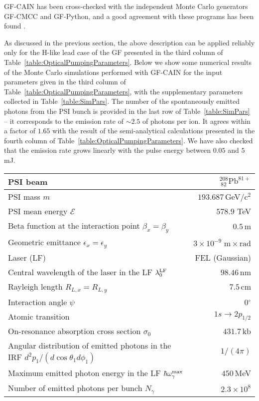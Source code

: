 {\sf GF-CAIN} has been cross-checked with the independent Monte Carlo generators {\sf GF-CMCC} and {\sf GF-Python}, and a good agreement with these programs has been found \cite{Curatolo:2018pza,GF-PoP-LoI:2019}. 

As discussed in the previous section, the above description can be applied reliably only for the H-like lead case of the GF presented in the third column of Table~\ref{table:OpticalPumpingParameters}.  Below we show some numerical results of the Monte Carlo simulations performed with {\sf GF-CAIN} for the input parameters given in the third column of Table~\ref{table:OpticalPumpingParameters}, with the supplementary parameters collected in Table~\ref{table:SimPars}.  The number of the spontaneously emitted photons from the PSI bunch is provided in the last row of Table~\ref{table:SimPars} -- it corresponds to the emission rate of $\sim 2.5$ of photons per ion.  It agrees within a factor of $1.65$ with the result of the semi-analytical calculations presented in the fourth column of Table~\ref{table:OpticalPumpingParameters}.  We have also checked that the emission rate grows linearly with the pulse energy between $0.05$ and $5\,$mJ.  
\begin{table*}[!htbp]
    \centering
    \caption{Some parameters for the {\sf GF-CAIN} simulations and the number of spontaneously emitted photons.}
	\begin{tabular}{lr}\hline\hline
		PSI beam  & ${}^{208}_{~82}\mathrm{Pb}^{81+}$\\
		\hline
		PSI mass $m$ & $193.687\,$GeV/c$^2$ \\
		PSI mean energy $\mathcal{E}$ & $578.9$ TeV \\
        Beta function at the interaction point $\beta_x=\beta_y$ & $0.5\,\mathrm{m}$\\
        Geometric emittance $\epsilon_x=\epsilon_y$ & $3\times 10^{-9}\;\mathrm{m\times rad}$\\
		\hline
		Laser (LF) & FEL (Gaussian)\\
		\hline
		Central wavelength of the laser in the LF $\lambda_0^{\rm LF}$ & $98.46\,$nm  \\
	    Rayleigh length $R_{L,x} = R_{L,y}$ & $7.5\,\mathrm{cm}$\\
		Interaction angle $\psi$ & 0$^\circ$\\
		\hline
 		 Atomic transition  & $1s \rightarrow 2p_{1/2}$\\
		\hline
		On-resonance absorption cross section $\sigma_0$ & $431.7\,$kb\\
		Angular distribution of emitted photons in the IRF $d^2p_1/(d\cos\theta_1 d\phi_1)$ & $1/(4\pi)$\\
		Maximum emitted photon energy in the LF $\hbar\omega_{\gamma}^{\rm max}$ & $450\,$MeV\\
		\hline
		Number of emitted photons per bunch $N_{\gamma}$ & $2.3\times 10^8$\\
		\hline\hline
	\end{tabular}	
\label{table:SimPars}	
\end{table*}

